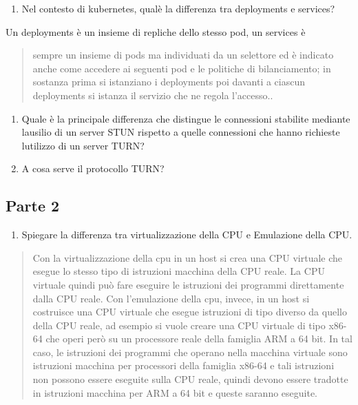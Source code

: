 \begin{enumerate}
\def\labelenumi{\arabic{enumi}.}
\setcounter{enumi}{17}
\item
  Nel contesto di kubernetes, qual\textquotesingle è la differenza tra
  deployments e services?
\end{enumerate}

Un deployments è un insieme di repliche dello stesso pod, un services è

\begin{quote}
sempre un insieme di pods ma individuati da un selettore ed è indicato
anche come accedere ai seguenti pod e le politiche di bilanciamento; in
sostanza prima si istanziano i deployments poi davanti a ciascun
deployments si istanza il servizio che ne regola l'accesso..
\end{quote}

\begin{enumerate}
\def\labelenumi{\arabic{enumi}.}
\setcounter{enumi}{18}
\item
  Quale è la principale differenza che distingue le connessioni
  stabilite mediante l\textquotesingle ausilio di un server STUN
  rispetto a quelle connessioni che hanno richieste
  l\textquotesingle utilizzo di un server TURN?
\item
  A cosa serve il protocollo TURN?
\end{enumerate}

\subsection{Parte 2}\label{parte-2}

\begin{enumerate}
\def\labelenumi{\arabic{enumi}.}
\item
  Spiegare la differenza tra virtualizzazione della CPU e Emulazione
  della CPU.
\end{enumerate}

\begin{quote}
Con la virtualizzazione della cpu in un host si crea una CPU virtuale
che esegue lo stesso tipo di istruzioni macchina della CPU reale. La CPU
virtuale quindi può fare eseguire le istruzioni dei programmi
direttamente dalla CPU reale. Con l'emulazione della cpu, invece, in un
host si costruisce una CPU virtuale che esegue istruzioni di tipo
diverso da quello della CPU reale, ad esempio si vuole creare una CPU
virtuale di tipo x86-64 che operi però su un processore reale della
famiglia ARM a 64 bit. In tal caso, le istruzioni dei programmi che
operano nella macchina virtuale sono istruzioni macchina per processori
della famiglia x86-64 e tali istruzioni non possono essere eseguite
sulla CPU reale, quindi devono essere tradotte in istruzioni macchina
per ARM a 64 bit e queste saranno eseguite.
\end{quote}

